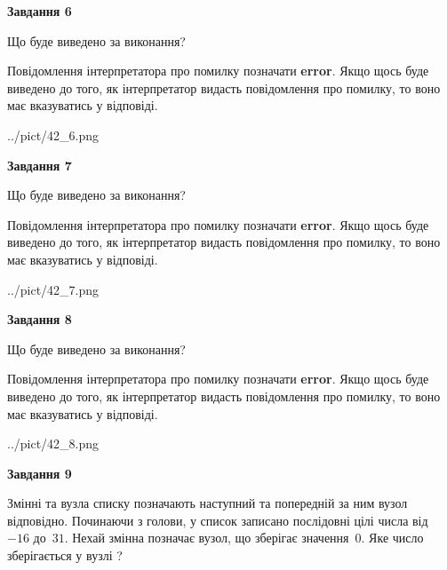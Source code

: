 \documentclass[12pt, ukrainian]{article}
\begin{document}
{\begin {large}
{\begin {center}\textbf{Завдання 6}\end {center}}\par
Що буде виведено за виконання?

Повідомлення інтерпретатора про помилку позначати \textbf{error}.
Якщо щось буде виведено до того, як інтерпретатор видасть повідомлення про помилку, 
то воно має вказуватись у відповіді. \par


\begin{center}
	{../pict/42_6.png}
\end{center}
\newpage

{\begin {center}\textbf{Завдання 7}\end {center}}\par
Що буде виведено за виконання?

Повідомлення інтерпретатора про помилку позначати \textbf{error}.
Якщо щось буде виведено до того, як інтерпретатор видасть повідомлення про помилку, 
то воно має вказуватись у відповіді. \par


\begin{center}
	{../pict/42_7.png}
\end{center}
\newpage

{\begin {center}\textbf{Завдання 8}\end {center}}\par
Що буде виведено за виконання?

Повідомлення інтерпретатора про помилку позначати \textbf{error}.
Якщо щось буде виведено до того, як інтерпретатор видасть повідомлення про помилку, 
то воно має вказуватись у відповіді. \par


\begin{center}
	{../pict/42_8.png}
\end{center}
\newpage

{\begin {center}\textbf{Завдання 9}\end {center}}\par
Змінні  та  вузла списку позначають наступний та попередній за ним вузол відповідно. Починаючи з голови, у список записано послідовні цілі числа від~$-16$ до~$31$. Нехай змінна  позначає вузол, що зберігає значення~$0$.
Яке число зберігається у вузлі  ?\par
\newpage


\end{large}}
\end{document}
